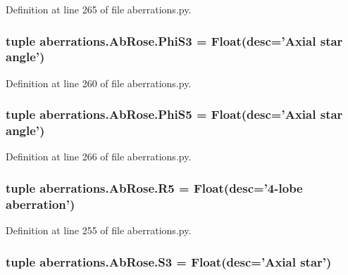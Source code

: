 Definition at line 265 of file aberrations.\-py.

\hypertarget{classaberrations_1_1_ab_rose_ab6a800ce8358e7d22854b901350e439a}{
\subsubsection[{Phi\-S3}]{\setlength{\rightskip}{0pt plus 5cm}tuple aberrations.\-Ab\-Rose.\-Phi\-S3 = Float(desc='Axial star {\bf angle}')\hspace{0.3cm}{\ttfamily [static]}}}\label{classaberrations_1_1_ab_rose_ab6a800ce8358e7d22854b901350e439a}


Definition at line 260 of file aberrations.\-py.

\hypertarget{classaberrations_1_1_ab_rose_af4d2fc615a8972145702cf6fa168d6e6}{
\subsubsection[{Phi\-S5}]{\setlength{\rightskip}{0pt plus 5cm}tuple aberrations.\-Ab\-Rose.\-Phi\-S5 = Float(desc='Axial star {\bf angle}')\hspace{0.3cm}{\ttfamily [static]}}}\label{classaberrations_1_1_ab_rose_af4d2fc615a8972145702cf6fa168d6e6}


Definition at line 266 of file aberrations.\-py.

\hypertarget{classaberrations_1_1_ab_rose_ad948cbe69d7cd14210dff4f94634b029}{
\subsubsection[{R5}]{\setlength{\rightskip}{0pt plus 5cm}tuple aberrations.\-Ab\-Rose.\-R5 = Float(desc='4-\/lobe {\bf aberration}')\hspace{0.3cm}{\ttfamily [static]}}}\label{classaberrations_1_1_ab_rose_ad948cbe69d7cd14210dff4f94634b029}


Definition at line 255 of file aberrations.\-py.

\hypertarget{classaberrations_1_1_ab_rose_aa7d3824bd8715876ca73e9ac7873d053}{
\subsubsection[{S3}]{\setlength{\rightskip}{0pt plus 5cm}tuple aberrations.\-Ab\-Rose.\-S3 = Float(desc='Axial star')\hspace{0.3cm}{\ttfamily [static]}}}\label{classaberrations_1_1_ab_rose_aa7d3824bd8715876ca73e9ac7873d053}


